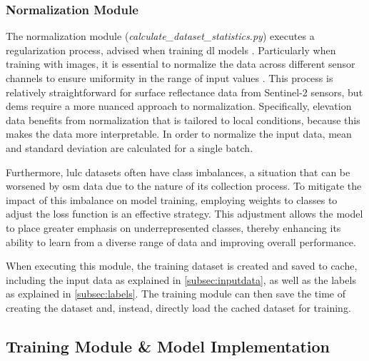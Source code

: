 \subsubsection*{Normalization Module}

The normalization module (\emph{calculate\_dataset\_statistics.py}) executes a regularization process, advised when training \gls{dl} models \autocite{Mehlin.Schacht.ea2023,Zhang.Lipton.ea2023}. Particularly when training with images, it is essential to normalize the data across different sensor channels to ensure uniformity in the range of input values \autocite{Szeliski2022}. This process is relatively straightforward for surface reflectance data from Sentinel-2 sensors, but \glspl{dem} require a more nuanced approach to normalization. Specifically, elevation data benefits from normalization that is tailored to local conditions, because this makes the data more interpretable. In order to normalize the input data, mean and standard deviation are calculated for a single batch.

Furthermore, \gls{lulc} datasets often have class imbalances, a situation that can be worsened by \gls{osm} data due to the nature of its collection process. To mitigate the impact of this imbalance on model training, employing weights to classes to adjust the loss function is an effective strategy. This adjustment allows the model to place greater emphasis on underrepresented classes, thereby enhancing its ability to learn from a diverse range of data and improving overall performance.

When executing this module, the training dataset is created and saved to cache, including the input data as explained in \ref{subsec:inputdata}, as well as the labels as explained in \ref{subsec:labels}. The training module can then save the time of creating the dataset and, instead, directly load the cached dataset for training. 

\subsection{Training Module \& Model Implementation}

